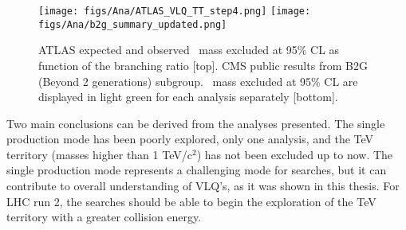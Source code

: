 \begin{figure}[!Hhtbp]
  \begin{center}
    \texttt{[image: figs/Ana/ATLAS\_VLQ\_TT\_step4.png]}
    \texttt{[image: figs/Ana/b2g\_summary\_updated.png]}
    \caption{ATLAS expected and observed \Tp~mass excluded at 95\% CL as function of the branching ratio [top]. CMS public results from B2G (Beyond 2 generations) subgroup. \Tp~mass excluded at 95\% CL are displayed in light green for each analysis separately [bottom].}
    \label{fig:SummaryRes}
  \end{center}
\end{figure}

Two main conclusions can be derived from the analyses presented. The single production mode has been poorly explored, only one analysis, and the TeV territory (masses higher than 1 TeV/$\text{c}^{2}$) has not been excluded up to now. The single production mode represents a challenging mode for searches, but it can contribute to overall understanding of VLQ's, as it was shown in this thesis. For LHC run 2, the searches should be able to begin the exploration of the TeV territory with a greater collision energy. 